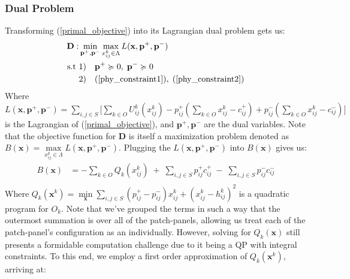 \documentclass[sigconf]{acmart}
\theoremstyle{definition}
\begin{document}
\begin{appendices}
\subsubsection{Dual Problem\\}
Transforming (\ref{primal_objective}) into its Lagrangian dual problem  gets us:
\begin{equation}
\begin{aligned}
    \mathbf{D: } & \min_{\mathbf{p}^+, \mathbf{p}^-}\max_{x_{ij}^k \in \Lambda} L(\mathbf{x}, \mathbf{p}^+, \mathbf{p}^-)\\
    \text{s.t } & 1) \quad \mathbf{p}^+ \succcurlyeq 0, \; \mathbf{p}^- \succcurlyeq 0\\
                & 2) \quad (\ref{phy_constraint1}), \; (\ref{phy_constraint2})\\
\end{aligned}
\label{dual_problem}
\end{equation}
Where $L(\mathbf{x}, \mathbf{p}^+, \mathbf{p}^-) = \sum\limits_{i, j \in S} \big[ \sum\limits_{k \in O}U_{ij}^k(x_{ij}^k) - p_{ij}^+( \sum\limits_{k \in O}x_{ij}^k - c_{ij}^+) + p_{ij}^-(\sum\limits_{k \in O} x_{ij}^k - c_{ij}^-) \big]$ is the Lagrangian of (\ref{primal_objective}), and $\mathbf{p}^+, \mathbf{p}^-$ are the dual variables. Note that the objective function for $\mathbf{D}$ is itself a maximization problem denoted as $B(\mathbf{x}) = \max\limits_{x_{ij}^k \in \Lambda} L(\mathbf{x}, \mathbf{p}^+, \mathbf{p}^-)$.
Plugging the $L(\mathbf{x},\mathbf{p}^+,\mathbf{p}^-)$ into $B(\mathbf{x})$ gives us:
\begin{equation}
\begin{aligned}
    B(\mathbf{x}) & = -\sum_{k \in O} Q_k(x_{ij}^k) \; + \; \sum_{i, j \in S} p_{ij}^+ c_{ij}^+ \; - \; \sum_{i, j \in S} p_{ij}^- c_{ij}^- \\ 
\end{aligned}\label{dual_objective}
\end{equation}
Where $Q_k(\mathbf{x}^k) = \min\limits_{\mathbf{x}} \sum\limits_{i, j \in S} (p_{ij}^+ - p_{ij}^-)x_{ij}^k + (x_{ij}^k - h_{ij}^k)^2$ is a quadratic program for $O_k$. Note that we've grouped the terms in such a way that the outermost summation is over all of the patch-panels, allowing us treat each of the patch-panel's configuration as an individually. However, solving for $Q_k(\mathbf{x})$ still presents a formidable computation challenge due to it being a QP with integral constraints. To this end, we employ a first order approximation of $Q_k(\mathbf{x}^k)$, arriving at:

\end{appendices}
\end{document}
